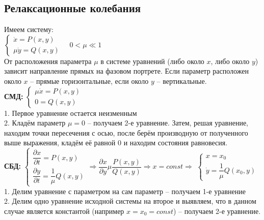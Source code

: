 \begin{multicols*}{2}
		\section{Релаксационные колебания}
		Имеем систему:\\
		$\begin{cases}
			\dot{x} = P(x, y)\\
			\mu\dot{y} = Q(x, y)
		\end{cases} \quad 0<\mu\ll 1$\\
		От расположения параметра $\mu$ в системе уравнений (либо около $x$, либо около $y$) зависит направление прямых на фазовом портрете. Если параметр расположен около $x$ – прямые горизонтальные, если около $y$ – вертикальные.\\ 
		\textbf{СМД:} \quad 
		$\begin{cases}
			\mu\dot{x} = P(x, y)\\
			0 = Q(x, y)
		\end{cases}$\\
		1. Первое уравнение остается неизменным\\
		2. Кладём параметр $\mu = 0$ – получаем 2-е уравнение. Затем, решая уравнение, находим точки пересечения с осью, после берём производную от полученного выше выражения, кладём её равной 0 и находим состояния равновесия.\\
		\textbf{СБД:} \quad
		$\begin{cases}
			\dfrac{\partial x}{\partial t} = P(x, y)\\
			\dfrac{\partial y}{\partial t} = \dfrac{1}{\mu} Q(x, y)
		\end{cases} \Rightarrow \dfrac{\partial x}{\partial y} \mu \dfrac{P(x, y)}{Q(x, y)} \Rightarrow x = const \Rightarrow $
		$\begin{cases}
			x = x_0\\
			\dot{y} = \dfrac{1}{\mu} Q(x_0, y)
		\end{cases}$\\
		1. Делим уравнение с параметром на сам параметр – получаем 1-е уравнение\\
		2. Делим одно уравнение исходной системы на второе и выявляем, что в данном случае является константой (например $x = x_0 = const$) – получаем 2-е уравнение.\\
		

\end{multicols*}
